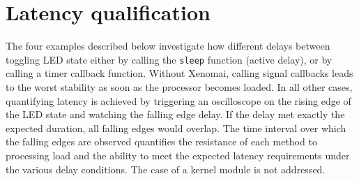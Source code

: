 \documentclass{article}
\begin{document}
{{%
%
%
%
%
%
%
%

\section{Latency qualification}

The four examples described below investigate how different delays between toggling
LED state either by calling the {\tt sleep} function (active delay), or by calling a timer
callback function. Without Xenomai, calling signal callbacks leads to the worst stability
as soon as the processor becomes loaded. In all other cases, quantifying latency is achieved
by triggering an oscilloscope on the rising edge of the LED state and watching the falling edge
delay. If the delay met exactly the expected duration, all falling edges would overlap. The
time interval over which the falling edges are observed quantifies the resistance of each method
to processing load and the ability to meet the expected latency requirements under the various
delay conditions. The case of a kernel module is not addressed.

}}
\end{document}
